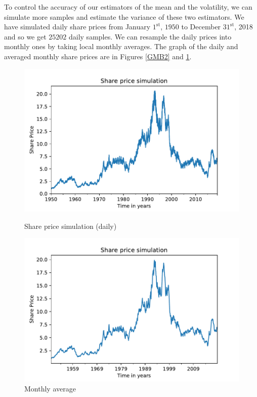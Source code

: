 \documentclass[10pt]{article}
\newenvironment{exercise}[2][Exercise]{\begin{trivlist}
  \item[\hskip \labelsep {\bfseries #1}\hskip \labelsep {\bfseries #2.}]}{\end{trivlist}}
\begin{document}
  \begin{exercise}{2}
    To control the accuracy of our estimators of the mean and the volatility, we can simulate more samples and estimate the variance of these two estimators.
    We have simulated daily share prices from January $1^{\text{st}}$, $1950$ to December $31^{\text{st}}$, 2018 and so we get $25202$ daily samples. We can resample the daily prices into monthly ones by taking local monthly averages. The graph of the daily and averaged monthly share prices are in Figures \ref{GMB2} and \ref{GMB2M}.
    \begin{figure}[h]
      \centering
      \begin{minipage}[b]{0.49\textwidth}
        \includegraphics[width = \textwidth]{Figures/simulation2.pdf}
        \caption{Share price simulation (daily)}
        \label{GMB2}
      \end{minipage}
      \hfill
      \begin{minipage}[b]{0.49\textwidth}
        \includegraphics[width = \textwidth]{Figures/simulation2monthly.pdf}
        \caption{Monthly average}
        \label{GMB2M}
      \end{minipage}	
      \end{figure}
  \end{exercise}



\end{document}
